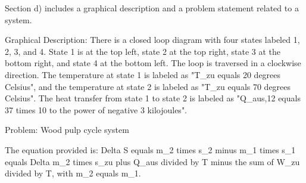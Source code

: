 Section d) includes a graphical description and a problem statement related to a system.

Graphical Description:
There is a closed loop diagram with four states labeled 1, 2, 3, and 4. State 1 is at the top left, state 2 at the top right, state 3 at the bottom right, and state 4 at the bottom left. The loop is traversed in a clockwise direction. The temperature at state 1 is labeled as "T_zu equals 20 degrees Celsius", and the temperature at state 2 is labeled as "T_zu equals 70 degrees Celsius". The heat transfer from state 1 to state 2 is labeled as "Q_aus,12 equals 37 times 10 to the power of negative 3 kilojoules".

Problem: Wood pulp cycle system

The equation provided is:
Delta S equals m_2 times s_2 minus m_1 times s_1 equals Delta m_2 times s_zu plus Q_aus divided by T minus the sum of W_zu divided by T, with m_2 equals m_1.